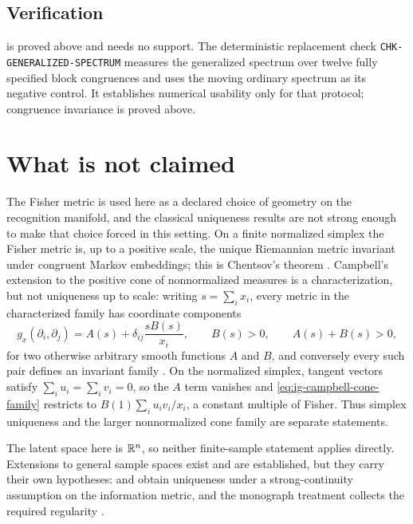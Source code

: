 \subsection*{Verification}

 is proved above and needs no support. The deterministic replacement check \texttt{CHK-GENERALIZED-SPECTRUM} measures the generalized spectrum over twelve fully specified block congruences and uses the moving ordinary spectrum as its negative control. It establishes numerical usability only for that protocol; congruence invariance is proved above. 

\section{What is not claimed}
\label{sec:ig-notclaimed}

The Fisher metric is used here as a declared choice of geometry on the recognition manifold, and the classical uniqueness results are not strong enough to make that choice forced in this setting. On a finite normalized simplex the Fisher metric is, up to a positive scale, the unique Riemannian metric invariant under congruent Markov embeddings; this is Chentsov's theorem \citep{Cencov1982}. Campbell's extension to the positive cone of nonnormalized measures is a characterization, but not uniqueness up to scale: writing $s=\sum_i x_i$, every metric in the characterized family has coordinate components
\begin{equation}
g_x(\partial_i,\partial_j)
=A(s)+\delta_{ij}\frac{sB(s)}{x_i},
\qquad
B(s)>0,
\qquad
A(s)+B(s)>0,
\label{eq:ig-campbell-cone-family}
\end{equation}
for two otherwise arbitrary smooth functions $A$ and $B$, and conversely every such pair defines an invariant family \citep{Campbell1986}. On the normalized simplex, tangent vectors satisfy $\sum_i u_i=\sum_i v_i=0$, so the $A$ term vanishes and \eqref{eq:ig-campbell-cone-family} restricts to $B(1)\sum_i u_iv_i/x_i$, a constant multiple of Fisher. Thus simplex uniqueness and the larger nonnormalized cone family are separate statements. 

The latent space here is $\mathbb R^{n}$, so neither finite-sample statement applies directly. Extensions to general sample spaces exist and are established, but they carry their own hypotheses: \citet{Ay2015} and \citet{Le2017} obtain uniqueness under a strong-continuity assumption on the information metric, and the monograph treatment collects the required regularity \citep{AyJostLeSchwachhofer2017}. 

